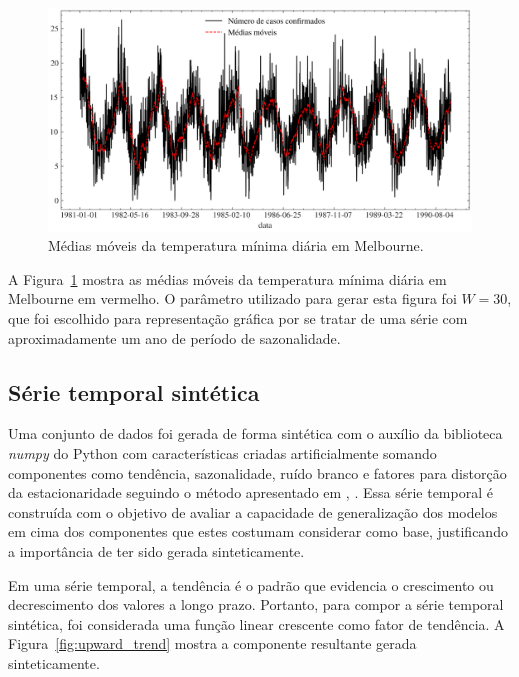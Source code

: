 \begin{figure}[!htp]
    \centering
    \includegraphics[width=5.0in]{img/temperatura_minima_diaria_ma.pdf}
    \caption{Médias móveis da temperatura mínima diária em Melbourne.}\label{fig:temperatura_minima_diaria_ma}
\end{figure}

A Figura~\ref{fig:temperatura_minima_diaria_ma} mostra as médias móveis da temperatura mínima diária em Melbourne em vermelho. O parâmetro utilizado para gerar esta figura foi $W=30$, que foi escolhido para representação gráfica por se tratar de uma série com aproximadamente um ano de período de sazonalidade.

\FloatBarrier

\subsection{Série temporal sintética}
Uma conjunto de dados foi gerada de forma sintética com o auxílio da biblioteca \textit{numpy} do Python com características criadas artificialmente somando componentes como tendência, sazonalidade, ruído branco e fatores para distorção da estacionaridade seguindo o método apresentado em \citeauthor{syntheticdata}, \citeyear{syntheticdata}\cite{syntheticdata}. Essa série temporal é construída com o objetivo de avaliar a capacidade de generalização dos modelos em cima dos componentes que estes costumam considerar como base, justificando a importância de ter sido gerada sinteticamente.

Em uma série temporal, a tendência é o padrão que evidencia o crescimento ou decrescimento dos valores a longo prazo. Portanto, para compor a série temporal sintética, foi considerada uma função linear crescente como fator de tendência. A Figura~\ref{fig:upward_trend} mostra a componente resultante gerada sinteticamente.

